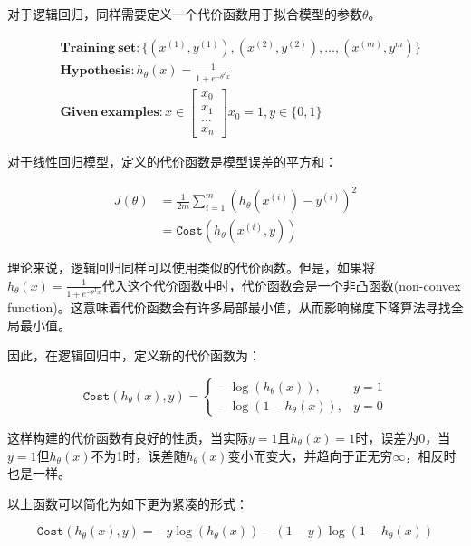 \documentclass[12pt, a4paper]{article}
\begin{document}
对于逻辑回归，同样需要定义一个代价函数用于拟合模型的参数$\theta$。

\begin{align*}
     & \mathbf{Training\ set}: \{(x^{(1)}, y^{(1)}), (x^{(2)}, y^{(2)}), \dots, (x^{(m)}, y^{m})\} \\
     & \mathbf{Hypothesis}: h_\theta(x)=\frac{1}{1+e^{-\theta^Tx}}                                 \\
     & \mathbf{Given\ examples}: x\in
    \begin{bmatrix}
        x_0   \\
        x_1   \\
        \dots \\
        x_n
    \end{bmatrix}
    x_0=1, y\in\{0, 1\}
\end{align*}

对于线性回归模型，定义的代价函数是模型误差的平方和：

\begin{align*}
    J(\theta) & = \frac{1}{2m}\sum_{i=1}^{m}(h_\theta(x^{(i)})-y^{(i)})^2 \\
              & = \mathtt{Cost}(h_\theta(x^{(i)}, y))
\end{align*}

理论来说，逻辑回归同样可以使用类似的代价函数。但是，如果将$h_\theta(x)=\frac{1}{1+e^{-\theta^Tx}}$代入这个代价函数中时，代价函数会是一个非凸函数(non-convex function)。这意味着代价函数会有许多局部最小值，从而影响梯度下降算法寻找全局最小值。

因此，在逻辑回归中，定义新的代价函数为：

\begin{equation*}
    \mathtt{Cost}(h_\theta(x), y) =
    \begin{cases}
        -\log(h_\theta(x)),   & y = 1 \\
        -\log(1-h_\theta(x)), & y = 0
    \end{cases}
\end{equation*}

这样构建的代价函数有良好的性质，当实际$y=1$且$h_\theta(x)=1$时，误差为0，当$y=1$但$h_\theta(x)$不为1时，误差随$h_\theta(x)$变小而变大，并趋向于正无穷$\infty$，相反时也是一样。

以上函数可以简化为如下更为紧凑的形式：

\begin{equation*}
    \mathtt{Cost}(h_{\theta}(x), y) = -y\log(h_\theta(x)) - (1-y)\log(1-h_\theta(x))
\end{equation*}
\end{document}
